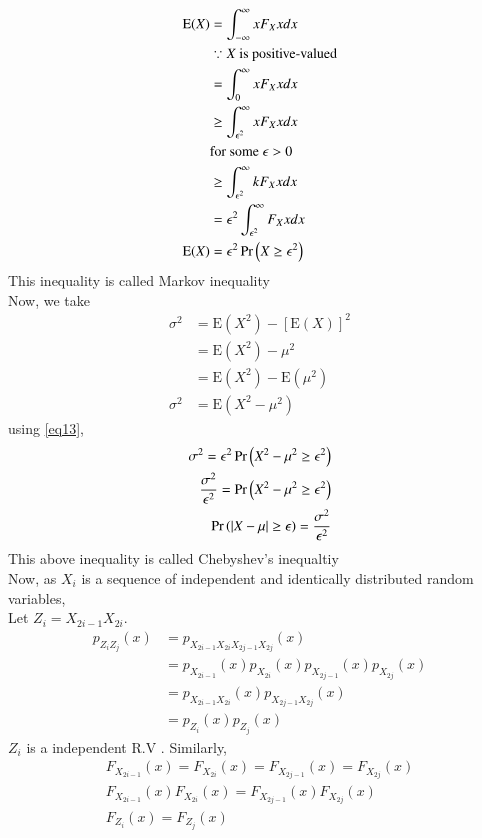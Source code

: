 \documentclass[journal,12pt,Twocolumn]{IEEEtran}
\theoremstyle{remark}
\begin{document}
\begin{align}
\text{E}(X)&=\int_{-\infty}^\infty xF_X{x}dx \\
&\because X \text{ is positive-valued} \\
&=\int_{0}^\infty xF_X{x}dx \\ 
&\geq \int_{\epsilon^2}^\infty xF_X{x}dx \\ 
&\text{for some } \epsilon > 0 \\
&\geq \int_{\epsilon^2}^\infty kF_X{x}dx \\
&=\epsilon^2\int_{\epsilon^2}^\infty F_X{x}dx \\
\label{eq13}\text{E}(X)&=\epsilon^2\Pr\left(X\geq \epsilon^2\right) 
\end{align}
This inequality is called Markov inequality \\
Now, we take 
\begin{align}
\sigma^2 &= \text{E}(X^2) - [\text{E}(X)]^2 \\
&= \text{E}(X^2) - \mu^2 \\
&= \text{E}(X^2) - \text{E}(\mu^2) \\
\sigma^2 &= \text{E}(X^2-\mu^2)
\end{align}
using \eqref{eq13},
\begin{align}
\sigma^2 = \epsilon^2\Pr\left(X^2-\mu^2\geq \epsilon^2\right) \\
\frac{\sigma^2}{\epsilon^2} = \Pr\left(X^2-\mu^2\geq \epsilon^2\right) \\
\Pr\left(|X-\mu|\geq \epsilon\right) = \frac{\sigma^2}{\epsilon^2} 
\end{align}
This above inequality is called Chebyshev's inequaltiy \\
Now, as $X_i$ is a sequence of independent and identically distributed random variables, \\
Let $Z_i = X_{2i-1}X_{2i}$. \\ 
\begin{align}
p_{Z_iZ_j}(x)&=p_{X_{2i-1}X_{2i}X_{2j-1}X_{2j}}(x) \\ 
&= p_{X_{2i-1}}(x)p_{X_{2i}}(x)p_{X_{2j-1}}(x)p_{X_{2j}}(x) \\
&= p_{X_{2i-1}X_{2i}}(x)p_{X_{2j-1}X_{2j}}(x) \\
&= p_{Z_i}(x)p_{Z_j}(x)
\end{align}
$Z_i$ is a independent R.V . Similarly,
\begin{align}
F_{X_{2i-1}}(x) = F_{X_{2i}}(x) = F_{X_{2j-1}}(x) = F_{X_{2j}}(x) \\
F_{X_{2i-1}}(x)F_{X_{2i}}(x) = F_{X_{2j-1}}(x)F_{X_{2j}}(x) \\
F_{Z_i}(x) = F_{Z_j}(x)
\end{align}
\end{document}
